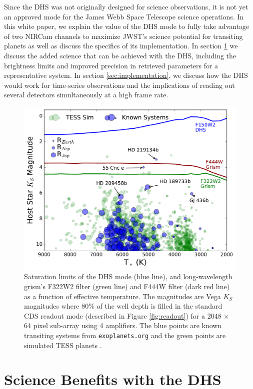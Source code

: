 \documentclass[iop]{emulateapj}
\begin{document}
Since the DHS was not originally designed for science observations, it is not yet an approved mode for the James Webb Space Telescope science operations.
In this white paper, we explain the value of the DHS mode to fully take advantage of two NIRCam channels to maximize JWST's science potential for transiting planets as well as discuss the specifics of its implementation.
In section \ref{sec:addedScience} we discuss the added science that can be achieved with the DHS, including the brightness limits and improved precision in retrieved parameters for a representative system.
In section \ref{sec:implementation}, we discuss how the DHS would work for time-series observations and the implications of reading out several detectors simultaneously at a high frame rate.

\begin{figure}[!b]
\includegraphics[width=1.0\columnwidth]{brightness_scape.pdf}
\caption{Saturation limits of the DHS mode (blue line), and long-wavelength grism's F322W2 filter (green line) and F444W filter (dark red line) as a function of effective temperature.
The magnitudes are Vega $K_S$ magnitudes where 80\% of the well depth is filled in the standard CDS readout mode (described in Figure \ref{fig:readout}) for a 2048 $\times$ 64 pixel sub-array using 4 amplifiers.
The blue points are known transiting systems from \texttt{exoplanets.org} and the green points are simulated TESS planets \citep{sullivan2015tess}.}\label{fig:saturationLim}
\end{figure}


\section{Science Benefits with the DHS}\label{sec:addedScience}
\end{document}
